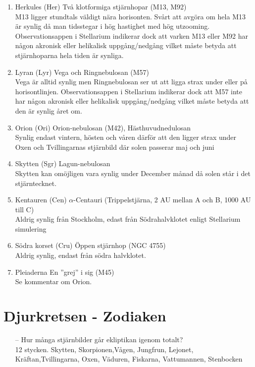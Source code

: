 \documentclass[./exercises.tex]{subfiles}
\begin{document}
\begin{itemize}
\begin{enumerate}[label=(\alph*)]
\item Herkules (Her) Två klotformiga stjärnhopar (M13, M92)\\
M13 ligger stundtals väldigt nära horisonten. Svårt att avgöra om hela M13 är synlig då man tidsstegar i hög hastighet
med hög utzooming. Observationsappen i Stellarium indikerar dock att varken M13 eller M92 har någon akronisk eller helikalisk
 uppgång/nedgång vilket måste betyda att stjärnhoparna hela tiden är synliga.

\item Lyran (Lyr) Vega och Ringnebulosan (M57)\\
Vega är alltid synlig men Ringnebulosan ser ut att ligga strax under eller på horisontlinjen.
Observationsappen i Stellarium indikerar dock att M57 inte har någon akronisk eller helikalisk
 uppgång/nedgång vilket måste betyda att den är synlig året om.
 
\item Orion (Ori) Orion-nebulosan (M42), Hästhuvudnedulosan\\
Synlig endast vintern, hösten och våren därför att den ligger strax under Oxen och Tvillingarnas stjärnbild
där solen passerar maj och juni
\item Skytten (Sgr) Lagun-nebulosan\\
Skytten kan omöjligen vara synlig under December månad då solen står i det stjärntecknet.
\item Kentauren (Cen) $\alpha$-Centauri (Trippelstjärna, 2 AU mellan A och B, 1000 AU
till C) \\
Aldrig synlig från Stockholm, edast från Södrahalvklotet enligt Stellarium simulering
\item Södra korset (Cru) Öppen stjärnhop (NGC 4755)\\
Aldrig synlig, endast från södra halvklotet.
\item Pleiaderna En ”grej” i sig (M45)\\
Se kommentar om Orion.
\end{enumerate}
    
\end{itemize}

\section{Djurkretsen - Zodiaken}
\begin{itemize}
    \item[--] Hur många stjärnbilder går ekliptikan igenom totalt?\\
     12 stycken. Skytten, Skorpionen,Vågen, Jungfrun, Lejonet, Kräftan,Tvillingarna, Oxen, Väduren,
     Fiskarna, Vattumannen, Stenbocken
\end{itemize}
\end{document}
